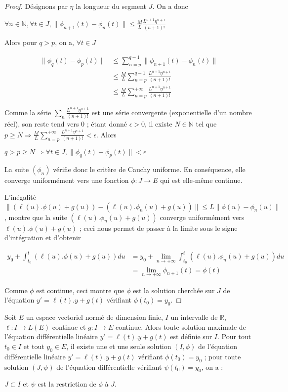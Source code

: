 \begin{proof}
Désignons par $\eta$ la longueur du segment $J$. On a donc

$\forall n \in \mathbb{N}, \forall t \in J,
\|\phi_{n+1}(t) - \phi_n(t)\| \leq \frac{M}{L} \frac{L^{n+1}\eta^{n+1}}{(n + 1)!}$

Alors pour $q > p$, on a, $\forall t \in J$

\begin{align*}
\|\phi_q(t) - \phi_p(t)\| &\leq \sum_{n=p}^{q-1} \|\phi_{n+1}(t) - \phi_n(t)\| \\
&\leq \frac{M}{L} \sum_{n=p}^{q-1} \frac{L^{n+1}\eta^{n+1}}{(n + 1)!} \\
&\leq \frac{M}{L} \sum_{n=p}^{+\infty} \frac{L^{n+1}\eta^{n+1}}{(n + 1)!}
\end{align*}

Comme la série $\sum_n \frac{L^{n+1}\eta^{n+1}}{(n+1)!}$ est une série convergente (exponentielle d'un nombre réel), son
reste tend vers $0$ ; étant donné $\epsilon > 0$, il existe $N \in \mathbb{N}$ tel
que $p \geq N \Rightarrow \frac{M}{L} \sum_{n=p}^{+\infty} \frac{L^{n+1}\eta^{n+1}}{(n+1)!} < \epsilon$. Alors

$q > p \geq N \Rightarrow \forall t \in J, \|\phi_q(t) - \phi_p(t)\| < \epsilon$

La suite $(\phi_n)$ vérifie donc le critère de Cauchy uniforme. En
conséquence, elle converge uniformément vers une fonction $\phi : J \rightarrow E$ qui
est elle-même continue.

L'inégalité $\|(\ell(u).\phi(u) + g(u)) - (\ell(u).\phi_n(u) + g(u))\| \leq L\|\phi(u) - \phi_n(u)\|$, montre que la suite
$(\ell(u).\phi_n(u) + g(u))$
converge uniformément vers $\ell(u).\phi(u) + g(u)$ ; ceci nous permet de passer
à la limite sous le signe d'intégration et d'obtenir

\begin{align*} 
y_0 + \int_{t_0}^t (\ell(u).\phi(u) + g(u)) du &= y_0 + \lim_{n \rightarrow +\infty} \int_{t_0}^t (\ell(u).\phi_n(u) + g(u)) du \\
&= \lim_{n \rightarrow +\infty} \phi_{n+1}(t) = \phi(t)
\end{align*}

Comme $\phi$ est continue, ceci montre que $\phi$ est la solution cherchée sur $J$
de l'équation $y' = \ell(t).y + g(t)$ vérifiant $\phi(t_0) = y_0$.
\end{proof}

\begin{thm}
Soit $E$ un espace vectoriel normé de dimension finie, $I$
un intervalle de $\mathbb{R}$, $\ell : I \rightarrow L(E)$ continue et $g : I \rightarrow E$ continue. Alors
toute solution maximale de l'équation différentielle linéaire $y' =
\ell(t).y + g(t)$ est définie sur $I$. Pour tout $t_0 \in I$ et tout
$y_0 \in E$, il existe une et une seule solution $(I,\phi)$ de
l'équation différentielle linéaire $y' = \ell(t).y + g(t)$ vérifiant
$\phi(t_0) = y_0$ ; pour toute solution $(J,\psi)$ de l'équation
différentielle vérifiant $\psi(t_0) = y_0$, on a :

$J \subset I$ et $\psi$ est la restriction de $\phi$ à $J$.
\end{thm}

